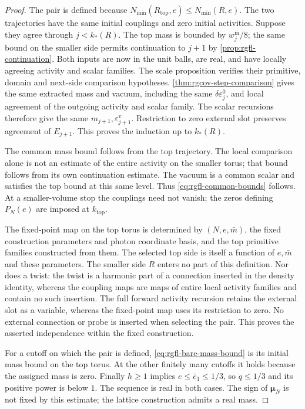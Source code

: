 \begin{proof}
The pair is defined because
$N_{\min}(R_{\mathrm{top}},e)\le N_{\min}(R,e)$.
The two trajectories have the same initial
couplings and zero initial activities.
Suppose they agree through $j<k_*(R)$.
The top mass is bounded by $w_j^{\mathrm m}/8$;
the same bound on the smaller side permits continuation
to $j+1$ by \cref{prop:rgfl-continuation}.
Both inputs are now in the unit balls, are real,
and have locally agreeing activity and scalar families.
The scale proposition verifies their primitive,
domain and next-side comparison hypotheses.
\cref{thm:rgcov-step-comparison} gives the
same extracted mass and vacuum, including the same
$\delta\varepsilon_j^0$, and local agreement of the
outgoing activity and scalar family.
The scalar recursions therefore give the same
$m_{j+1},\varepsilon_{j+1}^{\mathrm v}$.
Restriction to zero external slot preserves agreement
of $E_{j+1}$.
This proves the induction up to $k_*(R)$.

The common mass bound follows from the top trajectory.
The local comparison alone is not an estimate of
the entire activity on the smaller torus; that
bound follows from its own continuation estimate.
The vacuum is a common scalar and satisfies the
top bound at this same level. Thus
\eqref{eq:rgfl-common-bounds} follows.
At a smaller-volume stop the couplings need not
vanish; the zeros defining $P_N(e)$ are imposed
at $k_{\mathrm{top}}$.

The fixed-point map on the top torus is determined
by $(N,e,\bar m)$, the fixed construction parameters
and photon coordinate basis, and the top primitive
families constructed from them.
The selected top side is itself a function of
$e,\bar m$ and these parameters.
The smaller side $R$ enters no part of this definition.
Nor does a twist: the twist is a harmonic part
of a connection inserted in the density identity,
whereas the coupling maps are maps of entire
local activity families and contain no such insertion.
The full forward activity recursion retains the external slot
as a variable, whereas the fixed-point map uses its restriction
to zero. No external connection or probe is inserted when
selecting the pair.
This proves the asserted independence within
the fixed construction.

For a cutoff on which the pair is defined,
\eqref{eq:rgfl-bare-mass-bound} is its initial mass
bound on the top torus. At the other finitely many
cutoffs it holds because the assigned mass is zero.
Finally $h\ge1$ implies $e\le\bar e_1\le1/3$,
so $q\le1/3$ and its positive power is below $1$.
The sequence is real in both cases.
The sign of $\boldsymbol\mu_N$ is not fixed by this
estimate; the lattice construction admits a real mass.
\end{proof}

